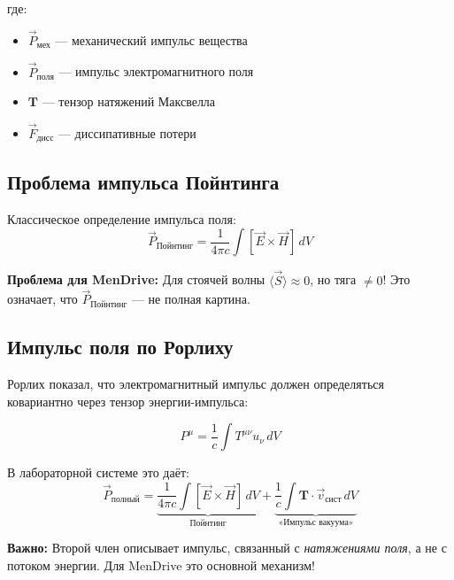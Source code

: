 \documentclass[a4paper,12pt]{article}
\begin{document}
где:
\begin{itemize}
    \item $\vec{P}_{\text{мех}}$ --- механический импульс вещества
    \item $\vec{P}_{\text{поля}}$ --- импульс электромагнитного поля
    \item $\mathbf{T}$ --- тензор натяжений Максвелла
    \item $\vec{F}_{\text{дисс}}$ --- диссипативные потери
\end{itemize}

\subsection{Проблема импульса Пойнтинга}

Классическое определение импульса поля:
\begin{equation}
\vec{P}_{\text{Пойнтинг}} = \frac{1}{4\pi c}\int [\vec{E}\times\vec{H}]\,dV
\label{eq:poynting_momentum}
\end{equation}

\textbf{Проблема для MenDrive:} Для стоячей волны $\langle\vec{S}\rangle \approx 0$,
но тяга $\neq 0$! Это означает, что $\vec{P}_{\text{Пойнтинг}}$ --- не полная
картина.

\subsection{Импульс поля по Рорлиху}

Рорлих \cite{Rohrlich1960} показал, что электромагнитный импульс должен
определяться ковариантно через тензор энергии-импульса:

\begin{equation}
P^\mu = \frac{1}{c}\int T^{\mu\nu} u_\nu\,dV
\label{eq:rohrlich_momentum}
\end{equation}

В лабораторной системе это даёт:
\begin{equation}
\boxed{
\vec{P}_{\text{полный}} = \underbrace{\frac{1}{4\pi c}\int [\vec{E}\times\vec{H}]\,dV}_{\text{Пойнтинг}} +
\underbrace{\frac{1}{c}\int \mathbf{T}\cdot\vec{v}_{\text{сист}}\,dV}_{\text{«Импульс вакуума»}}
}
\label{eq:full_momentum}
\end{equation}

\textbf{Важно:} Второй член описывает импульс, связанный с \textit{натяжениями
поля}, а не с потоком энергии. Для MenDrive это основной механизм!

\end{document}

